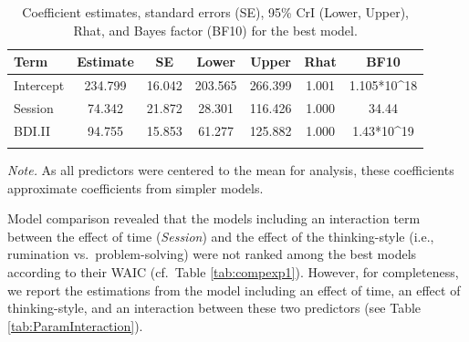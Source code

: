 \documentclass[a4paper,12pt,twoside,onecolumn,openright,final,oldfontcommands]{memoir}
\begin{document}
\begin{table}[H]
\begin{center}
\begin{threeparttable}
\caption{\label{tab:paramexp1}Coefficient estimates, standard errors (SE), 95\% CrI (Lower, Upper), Rhat, and Bayes factor (BF10) for the best model.}
\small{
\begin{tabular}{lcccccc}
\toprule
Term & \multicolumn{1}{c}{Estimate} & \multicolumn{1}{c}{SE} & \multicolumn{1}{c}{Lower} & \multicolumn{1}{c}{Upper} & \multicolumn{1}{c}{Rhat} & \multicolumn{1}{c}{BF10}\\
\midrule
Intercept & 234.799 & 16.042 & 203.565 & 266.399 & 1.001 & 1.105*10\textasciicircum{}18\\
Session & 74.342 & 21.872 & 28.301 & 116.426 & 1.000 & 34.44\\
BDI.II & 94.755 & 15.853 & 61.277 & 125.882 & 1.000 & 1.43*10\textasciicircum{}19\\
\bottomrule
\addlinespace
\end{tabular}
}
\begin{tablenotes}[para]
\textit{Note.} As all predictors were centered to the mean for analysis, these coefficients approximate coefficients from simpler models.
\end{tablenotes}
\end{threeparttable}
\end{center}
\end{table}

Model comparison revealed that the models including an interaction term between the effect of time (\emph{Session}) and the effect of the thinking-style (i.e., rumination vs.~problem-solving) were not ranked among the best models according to their WAIC (cf.~Table \ref{tab:compexp1}). However, for completeness, we report the estimations from the model including an effect of time, an effect of thinking-style, and an interaction between these two predictors (see Table \ref{tab:ParamInteraction}).
\end{document}

